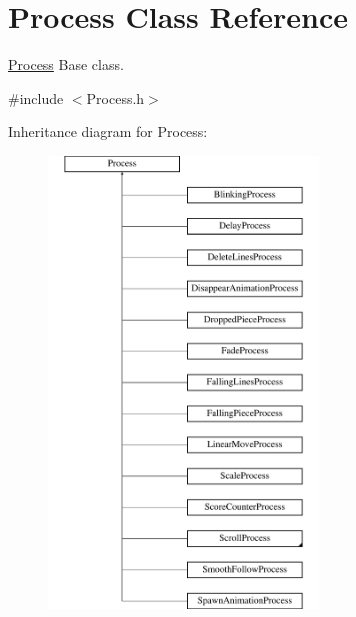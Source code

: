 \hypertarget{classProcess}{\section{Process Class Reference}
\label{classProcess}
}


\hyperlink{classProcess}{Process} Base class.  




{\ttfamily \#include $<$Process.\-h$>$}

Inheritance diagram for Process\-:\begin{figure}[H]
\begin{center}
\leavevmode
\includegraphics[height=12.000000cm]{classProcess}
\end{center}
\end{figure}
